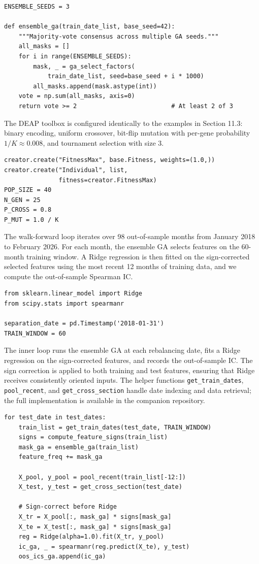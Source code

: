 \begin{verbatim}
ENSEMBLE_SEEDS = 3

def ensemble_ga(train_date_list, base_seed=42):
    """Majority-vote consensus across multiple GA seeds."""
    all_masks = []
    for i in range(ENSEMBLE_SEEDS):
        mask, _ = ga_select_factors(
            train_date_list, seed=base_seed + i * 1000)
        all_masks.append(mask.astype(int))
    vote = np.sum(all_masks, axis=0)
    return vote >= 2                          # At least 2 of 3
\end{verbatim}

The DEAP toolbox is configured identically to the examples in Section 11.3: binary encoding, uniform crossover, bit-flip mutation with per-gene probability $1/K \approx 0.008$, and tournament selection with size 3.

\begin{verbatim}
creator.create("FitnessMax", base.Fitness, weights=(1.0,))
creator.create("Individual", list,
               fitness=creator.FitnessMax)
POP_SIZE = 40
N_GEN = 25
P_CROSS = 0.8
P_MUT = 1.0 / K
\end{verbatim}

The walk-forward loop iterates over 98 out-of-sample months from January 2018 to February 2026. For each month, the ensemble GA selects features on the 60-month training window. A Ridge regression is then fitted on the sign-corrected selected features using the most recent 12 months of training data, and we compute the out-of-sample Spearman IC.

\begin{verbatim}
from sklearn.linear_model import Ridge
from scipy.stats import spearmanr

separation_date = pd.Timestamp('2018-01-31')
TRAIN_WINDOW = 60
\end{verbatim}

The inner loop runs the ensemble GA at each rebalancing date, fits a Ridge regression on the sign-corrected features, and records the out-of-sample IC. The sign correction is applied to both training and test features, ensuring that Ridge receives consistently oriented inputs. The helper functions \texttt{get\_train\_dates}, \texttt{pool\_recent}, and \texttt{get\_cross\_section} handle date indexing and data retrieval; the full implementation is available in the companion repository.

\begin{verbatim}
for test_date in test_dates:
    train_list = get_train_dates(test_date, TRAIN_WINDOW)
    signs = compute_feature_signs(train_list)
    mask_ga = ensemble_ga(train_list)
    feature_freq += mask_ga

    X_pool, y_pool = pool_recent(train_list[-12:])
    X_test, y_test = get_cross_section(test_date)

    # Sign-correct before Ridge
    X_tr = X_pool[:, mask_ga] * signs[mask_ga]
    X_te = X_test[:, mask_ga] * signs[mask_ga]
    reg = Ridge(alpha=1.0).fit(X_tr, y_pool)
    ic_ga, _ = spearmanr(reg.predict(X_te), y_test)
    oos_ics_ga.append(ic_ga)
\end{verbatim}

